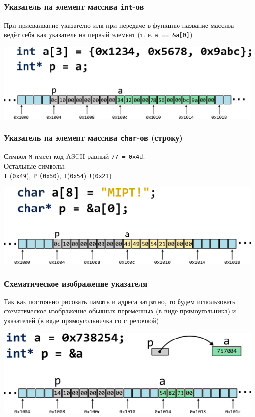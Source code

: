 \documentclass[12pt,pdf,hyperref={unicode}]{beamer}
\begin{document}
\begin{frame}[fragile]
\frametitle{Указатель на элемент массива \texttt{int}-ов} 
При присваивание указателю или при передаче в функцию 
название массива ведёт себя как указатель на первый 
элемент (т. е. \texttt{a == \&a[0]})
\begin{center}
\includegraphics[width=0.95\linewidth]{../images/memory/memory_6_pointer_to_int_array_by_name.png}
\end{center}
\end{frame}

\begin{frame}[fragile]
\frametitle{Указатель на элемент массива \texttt{char}-ов (строку)} 
Символ \texttt{M} имеет код ASCII равный \texttt{77 = 0x4d}.\\
Остальные символы:\\
\texttt{I} (\texttt{0x49}), \texttt{P} \texttt{(0x50}), \texttt{T}(\texttt{0x54}) \texttt{!}(\texttt{0x21})
\begin{center}
\includegraphics[width=0.95\linewidth]{../images/memory/memory_7_pointer_to_char_array.png}
\end{center}
\end{frame}


\begin{frame}[fragile]
\frametitle{Схематическое изображение указателя} 
Так как постоянно рисовать память и адреса затратно,
то будем использовать схематическое изображение обычных переменных (в виде прямоугольника)
 и указателей (в виде прямоугольничка со стрелочкой)
\begin{center}
\includegraphics[width=0.95\linewidth]{../images/memory/memory_8_schematic.png}
\end{center}
\end{frame}
\end{document}
